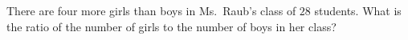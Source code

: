 There are four more girls than boys in Ms.\ Raub's class of $28$ students. What is the ratio of the number of girls to the number of boys in her class?
